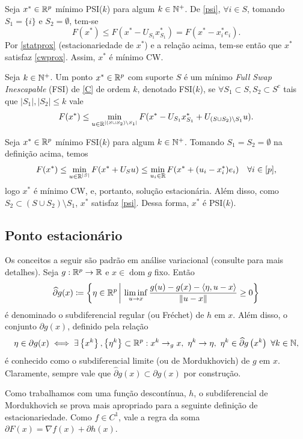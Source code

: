 Seja $x^*\in\mathbb{R}^p$ mínimo PSI($k$) para algum $k\in\mathbb{N}^+$. De \eqref{psi}, $\forall i\in S$, tomando $S_1=\{i\}$ e $S_2=\emptyset$, tem-se
\[F(x^*)\leq F(x^*-U_{S_1}x^*_{S_1})=F(x^*-x^*_ie_i).\]
Por \eqref{statprox} (estacionariedade de $x^*$) e a relação acima, tem-se então que $x^*$ satisfaz \eqref{cwprox}. Assim, $x^*$ é mínimo CW.

\begin{definition}
    Seja $k\in\mathbb{N}^+$. Um ponto $x^*\in\mathbb{R}^p$ com suporte $S$ é um mínimo \textit{Full Swap Inescapable} (FSI) de \eqref{C} de ordem $k$, denotado FSI($k$), se $\forall S_1\subset S,S_2\subset S^c$ tais que $|S_1|,|S_2|\leq k$ vale
    \[F(x^*)\leq\min_{u\in\mathbb{R}^{|(S\cup S_2)\setminus S_1|}}F(x^*-U_{S_1}x^*_{S_1}+U_{(S\cup S_2)\setminus S_1}u).\]
\end{definition}

Seja $x^*\in\mathbb{R}^p$ mínimo FSI($k$) para algum $k\in\mathbb{N}^+$. Tomando $S_1=S_2=\emptyset$ na definição acima, temos
\[F(x^*)\leq\min_{u\in\mathbb{R}^{|S|}}F(x^*+U_{S}u)\leq \min_{u_i\in\mathbb{R}}F(x^*+(u_i-x_i^*)e_i)\quad \forall i\in [p], \]
logo $x^*$ é mínimo CW, e, portanto, solução estacionária. Além disso, como $S_2\subset (S\cup S_2)\setminus S_1$, $x^*$ satisfaz \eqref{psi}. Dessa forma, $x^*$ é PSI($k$). 

\subsection{Ponto estacionário}
Os conceitos a seguir são padrão em análise variacional (consulte \cite[Chapter 3]{beckbook} para mais detalhes). Seja $g:\mathbb{R}^p\to\mathbb{R}$ e $x \in \operatorname{dom}g$ fixo. Então
$$
\widehat{\partial} g(x)\coloneqq\left\{\eta \in \mathbb{R}^p \,\middle\vert\ \liminf _{u \rightarrow x} \frac{g(u)-g(x)-\langle\eta, u-x\rangle}{\|u-x\|} \geq 0\right\}
$$
é denominado o subdiferencial regular (ou Fréchet) de $h$ em $x$. Além disso, o conjunto $\partial g(x)$, definido pela relação
$$
\eta \in \partial g(x)\iff\exists\left\{x^k\right\},\left\{\eta^k\right\} \subset \mathbb{R}^p: x^k \rightarrow_g x,\ \eta^k \rightarrow \eta,\ \eta^k \in \widehat{\partial} g\left(x^k\right)\ \forall k \in \mathbb{N},
$$
é conhecido como o subdiferencial limite (ou de Mordukhovich) de $g$ em $x$. Claramente, sempre vale que $\widehat{\partial} g(x) \subset \partial g(x)$ por construção. 

Como trabalhamos com uma função descontínua, $h$, o subdiferencial de Mordukhovich se prova mais apropriado para a seguinte definição de estacionariedade. Como $f\in C^1$, vale a regra da soma \cite[Proposition 1.30]{mordu2018} $\partial F(x)=\nabla f(x)+\partial h(x)$.

